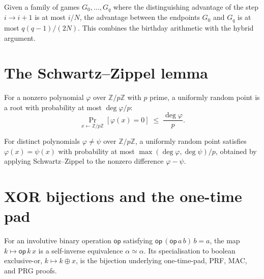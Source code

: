 \begin{theorem}
  \label{thm:birthday-advantage}
  \leanok
  Given a family of games $G_0, \dots, G_q$ where the distinguishing advantage
  of the step $i \to i+1$ is at most $i/N$, the advantage between the endpoints
  $G_0$ and $G_q$ is at most $q(q-1)/(2N)$. This combines the birthday
  arithmetic with the hybrid argument.
\end{theorem}

\section{The Schwartz--Zippel lemma}

\begin{theorem}
  \label{thm:schwartz-zippel}
  \leanok
  For a nonzero polynomial $\varphi$ over $\mathbb{Z}/p\mathbb{Z}$ with $p$
  prime, a uniformly random point is a root with probability at most
  $\deg\varphi / p$:
  \[
    \Pr_{x \leftarrow \mathbb{Z}/p\mathbb{Z}}[\varphi(x) = 0]
    \;\leq\; \frac{\deg\varphi}{p}.
  \]
\end{theorem}

\begin{corollary}
  \label{cor:poly-identity}
  \leanok
  For distinct polynomials $\varphi \neq \psi$ over $\mathbb{Z}/p\mathbb{Z}$, a
  uniformly random point satisfies $\varphi(x) = \psi(x)$ with probability at
  most $\max(\deg\varphi, \deg\psi)/p$, obtained by applying Schwartz--Zippel to
  the nonzero difference $\varphi - \psi$.
\end{corollary}

\section{XOR bijections and the one-time pad}

\begin{definition}
  \label{def:xor-bij}
  \leanok
  For an involutive binary operation $\mathsf{op}$ satisfying
  $\mathsf{op}\,(\mathsf{op}\,a\,b)\,b = a$, the map $k \mapsto \mathsf{op}\,k\,x$
  is a self-inverse equivalence $\alpha \simeq \alpha$. Its specialisation to
  boolean exclusive-or, $k \mapsto k \oplus x$, is the bijection underlying
  one-time-pad, PRF, MAC, and PRG proofs.
\end{definition}

